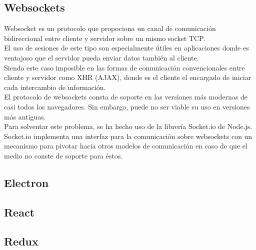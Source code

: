 \subsection {Websockets}

Websocket es un protocolo que propociona un canal de comunicación bidireccional entre cliente y servidor sobre un mismo socket TCP. \\
El uso de sesiones de este tipo son especialmente útiles en aplicaciones donde es ventajoso que el servidor pueda enviar datos también al cliente. \\
Siendo este caso imposible en las formas de comunicación convencionales entre cliente y servidor como XHR (AJAX), donde es el cliente el encargado de iniciar cada intercambio de información. \\

El protocolo de websockets consta de soporte en las versiones más modernas de casi todos los navegadores. Sin embargo, puede no ser viable su uso en versiones más antiguas. \\

Para solventar este problema, se ha hecho uso de la librería Socket.io de Node.js. \\ 
Socket.io implementa una interfaz para la comunicación sobre websockets con un mecanismo para pivotar hacia otros modelos de comunicación en caso de que el medio no conste de soporte para éstos. \\
\subsection {Electron}
\subsection {React}
\subsection {Redux}